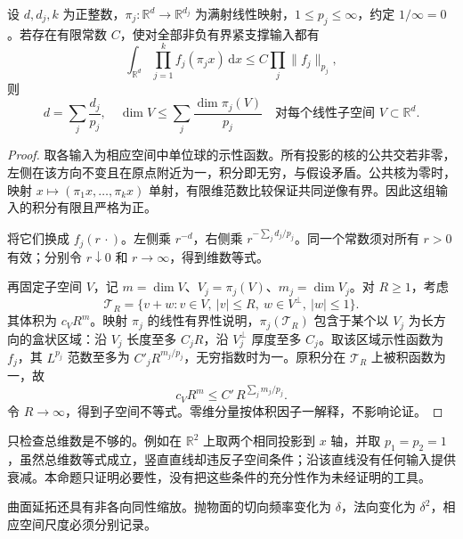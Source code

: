 \begin{proposition}[投影积分的维数必要条件]\label{b2:prop:25-dimension-necessary}
设 \(d,d_j,k\) 为正整数，\(\pi_j:\mathbb R^d\to\mathbb R^{d_j}\) 为满射线性映射，\(1\leq p_j\leq\infty\)，约定 \(1/\infty=0\)。若存在有限常数 \(C\)，使对全部非负有界紧支撑输入都有
\[
 \int_{\mathbb R^d}\prod_{j=1}^k f_j(\pi_jx)\,\mathrm dx
 \leq C\prod_j\|f_j\|_{p_j},
\]
则
\[
 d=\sum_j\frac{d_j}{p_j},
 \quad
 \dim V\leq\sum_j\frac{\dim\pi_j(V)}{p_j}
 \quad\text{对每个线性子空间 }V\subset\mathbb R^d.
\]
\end{proposition}
\begin{proof}
取各输入为相应空间中单位球的示性函数。所有投影的核的公共交若非零，左侧在该方向不变且在原点附近为一，积分即无穷，与假设矛盾。公共核为零时，映射 \(x\mapsto(\pi_1x,\ldots,\pi_kx)\) 单射，有限维范数比较保证共同逆像有界。因此这组输入的积分有限且严格为正。

将它们换成 \(f_j(r\,\cdot)\)。左侧乘 \(r^{-d}\)，右侧乘 \(r^{-\sum_jd_j/p_j}\)。同一个常数须对所有 \(r>0\) 有效；分别令 \(r\downarrow0\) 和 \(r\to\infty\)，得到维数等式。

再固定子空间 \(V\)，记 \(m=\dim V\)、\(V_j=\pi_j(V)\)、\(m_j=\dim V_j\)。对 \(R\geq1\)，考虑
\[
 \mathcal T_R=\{v+w:v\in V,\ |v|\leq R,\ 
                      w\in V^\perp,\ |w|\leq1\}.
\]
其体积为 \(c_VR^m\)。映射 \(\pi_j\) 的线性有界性说明，\(\pi_j(\mathcal T_R)\) 包含于某个以 \(V_j\) 为长方向的盒状区域：沿 \(V_j\) 长度至多 \(C_jR\)，沿 \(V_j^\perp\) 厚度至多 \(C_j\)。取该区域示性函数为 \(f_j\)，其 \(L^{p_j}\) 范数至多为 \(C'_jR^{m_j/p_j}\)，无穷指数时为一。原积分在 \(\mathcal T_R\) 上被积函数为一，故
\[
 c_VR^m\leq C'\,R^{\sum_jm_j/p_j}.
\]
令 \(R\to\infty\)，得到子空间不等式。零维分量按体积因子一解释，不影响论证。
\end{proof}

只检查总维数是不够的。例如在 \(\mathbb R^2\) 上取两个相同投影到 \(x\) 轴，并取 \(p_1=p_2=1\)，虽然总维数等式成立，竖直直线却违反子空间条件；沿该直线没有任何输入提供衰减。本命题只证明必要性，没有把这些条件的充分性作为未经证明的工具。

\ProseParagraphBreak

曲面延拓还具有非各向同性缩放。抛物面的切向频率变化为 \(\delta\)，法向变化为 \(\delta^2\)，相应空间尺度必须分别记录。

